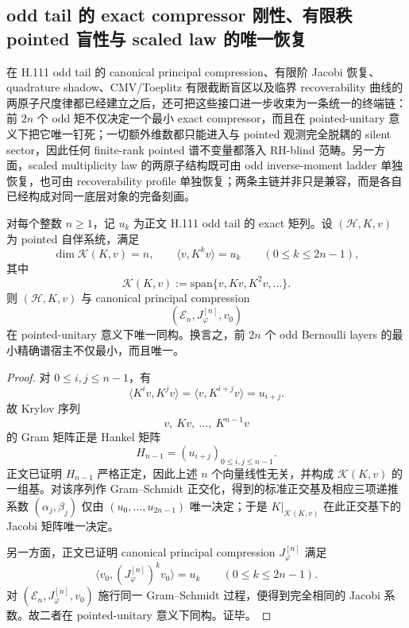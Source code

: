\subsection{odd tail 的 exact compressor 刚性、有限秩 pointed 盲性与 scaled law 的唯一恢复}\label{subsec:conclusion-oddtail-compressor-scaledlaw-recoverability-rigidity}
在 H.111 odd tail 的 canonical principal compression、有限阶 Jacobi 恢复、quadrature shadow、CMV/Toeplitz 有限截断盲区以及临界 recoverability 曲线的两原子尺度律都已经建立之后，还可把这些接口进一步收束为一条统一的终端链：前 \(2n\) 个 odd 矩不仅决定一个最小 exact compressor，而且在 pointed-unitary 意义下把它唯一钉死；一切额外维数都只能进入与 pointed 观测完全脱耦的 silent sector，因此任何 finite-rank pointed 谱不变量都落入 RH-blind 范畴。另一方面，scaled multiplicity law 的两原子结构既可由 odd inverse-moment ladder 单独恢复，也可由 recoverability profile 单独恢复；两条主链并非只是兼容，而是各自已经构成对同一底层对象的完备刻画。

\begin{theorem}\label{thm:conclusion-oddtail-minimal-exact-compressor-pointed-unitary-rigidity}
对每个整数 \(n\ge 1\)，记 \(u_k\) 为正文 H.111 odd tail 的 exact 矩列。设 \((\mathcal H,K,v)\) 为 pointed 自伴系统，满足
\[
\dim \mathcal K(K,v)=n,
\qquad
\langle v,K^k v\rangle=u_k
\qquad (0\le k\le 2n-1),
\]
其中
\[
\mathcal K(K,v):=\mathrm{span}\{v,Kv,K^2v,\dots\}.
\]
则 \((\mathcal H,K,v)\) 与 canonical principal compression
\[
(\mathcal E_n,J_\varphi^{[n]},v_0)
\]
在 pointed-unitary 意义下唯一同构。换言之，前 \(2n\) 个 odd Bernoulli layers 的最小精确谱宿主不仅最小，而且唯一。
\end{theorem}
\begin{proof}
对 \(0\le i,j\le n-1\)，有
\[
\langle K^i v,K^j v\rangle=\langle v,K^{i+j}v\rangle=u_{i+j}.
\]
故 Krylov 序列
\[
v,\ Kv,\ \dots,\ K^{n-1}v
\]
的 Gram 矩阵正是 Hankel 矩阵
\[
H_{n-1}=(u_{i+j})_{0\le i,j\le n-1}.
\]
正文已证明 \(H_{n-1}\) 严格正定，因此上述 \(n\) 个向量线性无关，并构成 \(\mathcal K(K,v)\) 的一组基。对该序列作 Gram--Schmidt 正交化，得到的标准正交基及相应三项递推系数 \((\alpha_j,\beta_j)\) 仅由 \((u_0,\dots,u_{2n-1})\) 唯一决定；于是 \(K|_{\mathcal K(K,v)}\) 在此正交基下的 Jacobi 矩阵唯一决定。

另一方面，正文已证明 canonical principal compression \(J_\varphi^{[n]}\) 满足
\[
\langle v_0,(J_\varphi^{[n]})^k v_0\rangle=u_k
\qquad (0\le k\le 2n-1).
\]
对 \((\mathcal E_n,J_\varphi^{[n]},v_0)\) 施行同一 Gram--Schmidt 过程，便得到完全相同的 Jacobi 系数。故二者在 pointed-unitary 意义下同构。证毕。
\end{proof}

